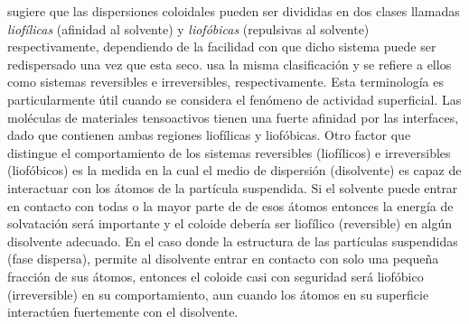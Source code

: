 \cite{Freundlich} sugiere que las dispersiones coloidales pueden ser divididas en dos clases llamadas \emph{liofílicas} (afinidad al solvente) y \emph{liofóbicas} (repulsivas al solvente) respectivamente, dependiendo de la facilidad con que dicho sistema puede ser redispersado una vez que esta seco.   
\cite{Kruyt} usa la misma clasificación y se refiere a ellos como sistemas reversibles e irreversibles, respectivamente. Esta terminología es particularmente útil cuando se considera el fenómeno de actividad superficial. Las moléculas de materiales tensoactivos tienen una fuerte afinidad por las interfaces, dado que contienen ambas regiones liofílicas y liofóbicas.
Otro factor que distingue el comportamiento de los sistemas reversibles (liofílicos) e irreversibles (liofóbicos) es la medida en la cual el medio de dispersión (disolvente) es capaz de interactuar con los átomos de la partícula suspendida. Si el solvente puede entrar en contacto con todas o la mayor parte de de esos átomos entonces la energía de solvatación será importante y el coloide debería ser liofílico (reversible) en algún disolvente adecuado. En el caso donde la estructura de las partículas suspendidas (fase dispersa), permite al disolvente entrar en contacto con solo una pequeña fracción de sus átomos, entonces el coloide casi con seguridad será liofóbico (irreversible) en su comportamiento, aun cuando los átomos en su superficie interactúen fuertemente con el disolvente. 

